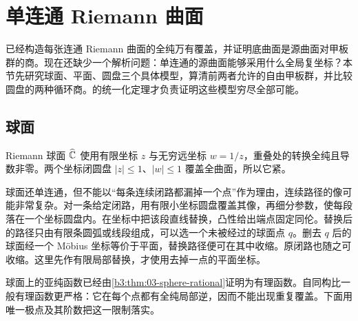 \section{单连通 Riemann 曲面}
\label{b3:sec:1201}

已经构造每张连通 Riemann 曲面的全纯万有覆盖，并证明底曲面是源曲面对甲板群的商。现在还缺少一个解析问题：单连通的源曲面能够采用什么全局复坐标？本节先研究球面、平面、圆盘三个具体模型，算清前两者允许的自由甲板群，并比较圆盘的两种循环商。的统一化定理才负责证明这些模型穷尽全部可能。

\subsection{球面}
\label{b3:subsec:120101}

Riemann 球面 \(\widehat{\mathbb C\kern0pt}\) 使用有限坐标 \(z\) 与无穷远坐标 \(w=1/z\)，重叠处的转换全纯且导数非零。两个坐标闭圆盘 \(|z|\le1\)、\(|w|\le1\) 覆盖全曲面，所以它紧。

\ProseParagraphBreak
球面还单连通，但不能以“每条连续闭路都漏掉一个点”作为理由，连续路径的像可能非常复杂。对一条给定闭路，用有限小坐标圆盘覆盖其像，再细分参数，使每段落在一个坐标圆盘内。在坐标中把该段直线替换，凸性给出端点固定同伦。替换后的路径只由有限条圆弧或线段组成，可以选一个未被经过的球面点 \(q\)。删去 \(q\) 后的球面经一个 Möbius 坐标等价于平面，替换路径便可在其中收缩。原闭路也随之可收缩。这里先作有限局部替换，才使用去掉一点的平面坐标。

\ProseParagraphBreak
球面上的亚纯函数已经由\cref{b3:thm:03-sphere-rational}证明为有理函数。自同构比一般有理函数更严格：它在每个点都有全纯局部逆，因而不能出现重复覆盖。下面用唯一极点及其阶数把这一限制落实。


